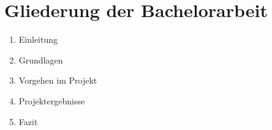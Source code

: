 \section{Gliederung der Bachelorarbeit}
\begin{enumerate}
\item Einleitung
\item Grundlagen
\item Vorgehen im Projekt
\item Projektergebnisse
\item Fazit
\end{enumerate}
